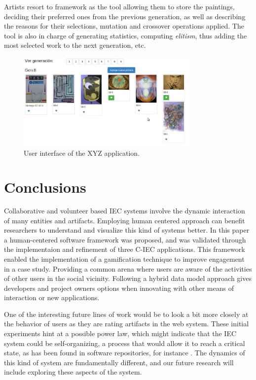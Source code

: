 Artists resort to framework as the tool allowing them to store the paintings, deciding their preferred ones from the
previous generation, as well as describing the reasons for their selections, mutation and crossover operations applied.
The tool is also in charge of generating statistics, computing \textit{elitism}, thus adding the most selected work to 
the next generation, etc.

\begin{figure}[!t]
    \centering
        \includegraphics[width=3.5in]{img/interfaceXYZ.png}
    \caption{User interface of the XYZ application.}
    \label{fig:xyz}
\end{figure}

\section{Conclusions}
\label{sec:conclusions}

Collaborative and volunteer based IEC systems involve the dynamic 
interaction of many entities and artifacts. Employing human centered approach 
can benefit researchers to understand and visualize this kind of systems better.
In this paper a human-centered software framework was proposed, and was validated
through the implementaion and refinement of three C-IEC applications.
This framework enabled the implementation of a gamification technique 
to improve engagement in a case study. Providing a common arena where users are aware of the
activities of other users in the social vicinity. Following a hybrid data model approach
gives developers and project owners options when innovating with other means
of interaction or new applications.

One of the interesting future lines of work would be to look a bit
more closely at the behavior of users as they are rating artifacts 
in the web system. These initial experiments hint at a possible power law, which might indicate that
the IEC system could be self-organizing, a process that would allow it
to reach a critical state, as has been found in software repositories,
for instance \cite{Merelo2016:repomining}. 
The dynamics of this kind of system are fundamentally different, and our future research will
include exploring these aspects of the system. 

